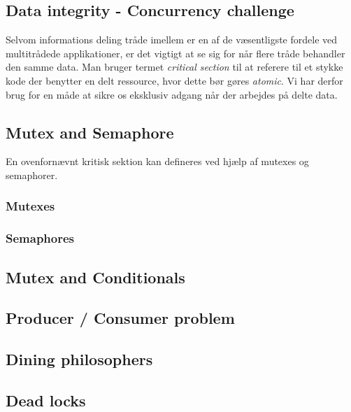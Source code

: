 \newpage

\subsection{Data integrity - Concurrency challenge}

Selvom informations deling tråde imellem er en af de væsentligste fordele ved multitrådede applikationer, er det vigtigt at se sig for når flere tråde behandler den samme data.
Man bruger termet \textit{critical section} til at referere til et stykke kode der benytter en delt ressource, hvor dette bør gøres \textit{atomic}. Vi har derfor brug for en måde at sikre os eksklusiv adgang når der arbejdes på delte data.

\subsection{Mutex and Semaphore}

En ovenfornævnt kritisk sektion kan defineres ved hjælp af mutexes og semaphorer.

\subsubsection{Mutexes}

\subsubsection{Semaphores}

\subsection{Mutex and Conditionals}

\subsection{Producer / Consumer problem}

\subsection{Dining philosophers}

\subsection{Dead locks}